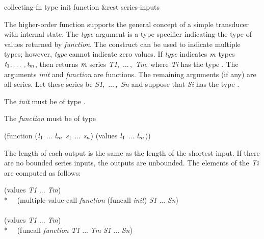 \begin{defun}[Function]
collecting-fn type init function &rest series-inputs

The higher-order function  supports the general concept of
a simple transducer with internal state.  The \emph{type} argument is a type
specifier indicating the type of values returned by \emph{function}.
The  construct can be used to indicate multiple types; however,
\emph{type} cannot indicate zero values.  If \emph{type} indicates $\emph{m}$ types
$\emph{t}_1, \ldots\,, \emph{t}_{m}$,
then  returns $\emph{m}$ series {\it
T1},~$\ldots\,$,~\emph{Tm}, where \emph{Ti} has the
type .  The
arguments \emph{init} and \emph{function} are functions.  The remaining
arguments (if any) are all series.  Let these series be {\it
S1},~$\ldots\,$,~\emph{Sn} and suppose that \emph{Si} has the type
.

The \emph{init} must be of type 
.

The \emph{function} must be of type
\begin{lisp}
(function ($\emph{t}_1$ ... $\emph{t}_{m}$ $\emph{s}_1$ ... $\emph{s}_{n}$) (values $\emph{t}_1$ ... $\emph{t}_{m}$))
\end{lisp}

The length of each output is the same as the length of the shortest input.
If there are no bounded series inputs, the outputs are unbounded.
The elements of the \emph{Ti} are computed as follows:
\begin{lisp}
(values \emph{T1} ... \emph{Tm}) {\EQ} \\*
~~(multiple-value-call \emph{function} (funcall  \emph{init}) \emph{S1} ... \emph{Sn}) \\
\\
(values \emph{T1} ... \emph{Tm}) {\EQ} \\*
~~(funcall \emph{function} \emph{T1} ... \emph{Tm} \emph{S1} ... \emph{Sn}) 
\end{lisp}


\end{defun}

